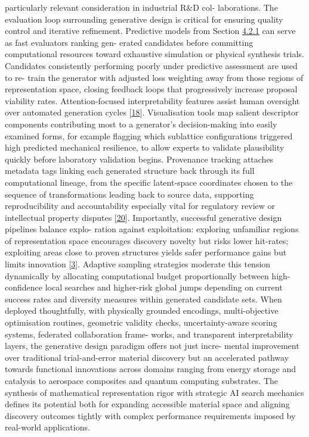 \documentclass[
]{article}
\begin{document}
particularly relevant consideration in industrial R\&D col- laborations.
The evaluation loop surrounding generative design is critical for
ensuring quality control and iterative refinement. Predictive models
from Section
\hyperref[predictive-modelling-of-material-performance]{4.2.1} can serve
as fast evaluators ranking gen- erated candidates before committing
computational resources toward exhaustive simulation or physical
synthesis trials. Candidates consistently performing poorly under
predictive assessment are used to re- train the generator with adjusted
loss weighting away from those regions of representation space, closing
feedback loops that progressively increase proposal viability rates.
Attention-focused interpretability features assist human oversight over
automated generation cycles {[}\hyperref[_bookmark58]{18}{]}.
Visualisation tools map salient descriptor components contributing most
to a generator's decision-making into easily examined forms, for example
flagging which sublattice configurations triggered high predicted
mechanical resilience, to allow experts to validate plausibility quickly
before laboratory validation begins. Provenance tracking attaches
metadata tags linking each generated structure back through its full
computational lineage, from the specific latent-space coordinates chosen
to the sequence of transformations leading back to source data,
supporting reproducibility and accountability especially vital for
regulatory review or intellectual property disputes
{[}\hyperref[_bookmark60]{20}{]}. Importantly, successful generative
design pipelines balance explo- ration against exploitation: exploring
unfamiliar regions of representation space encourages discovery novelty
but risks lower hit-rates; exploiting areas close to proven structures
yields safer performance gains but limits innovation
{[}\hyperref[_bookmark43]{3}{]}. Adaptive sampling strategies moderate
this tension dynamically by allocating computational budget
proportionally between high-confidence local searches and higher-risk
global jumps depending on current success rates and diversity measures
within generated candidate sets. When deployed thoughtfully, with
physically grounded encodings, multi-objective optimisation routines,
geometric validity checks, uncertainty-aware scoring systems, federated
collaboration frame- works, and transparent interpretability layers, the
generative design paradigm offers not just incre- mental improvement
over traditional trial-and-error material discovery but an accelerated
pathway towards functional innovations across domains ranging from
energy storage and catalysis to aerospace composites and quantum
computing substrates. The synthesis of mathematical representation rigor
with strategic AI search mechanics defines its potential both for
expanding accessible material space and aligning discovery outcomes
tightly with complex performance requirements imposed by real-world
applications.
\end{document}
